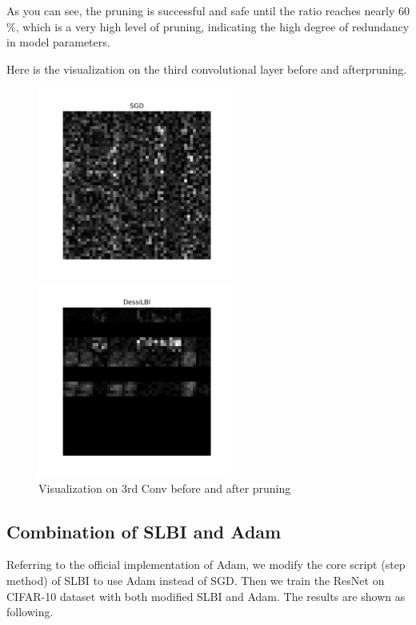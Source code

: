 \documentclass[a4paper, 11pt]{article} %
\begin{document}
As you can see, the pruning is successful and safe until the ratio reaches nearly 60$\%$,
which is a very high level of pruning, indicating the high degree of redundancy in model
parameters.

Here is the visualization on the third convolutional layer before and afterpruning.

\begin{figure}[H]
	\begin{minipage}[t]{0.48\textwidth}
		\centering
		\includegraphics[width=2.5in]{./img/conv-sgd.png}
	\end{minipage}
	\begin{minipage}[t]{0.48\textwidth}
		\centering
		\includegraphics[width=2.5in]{./img/conv-slbi.png}
	\end{minipage}
	\caption{Visualization on 3rd Conv before and after pruning}
\end{figure}

\subsection{\textbf{Combination of SLBI and Adam}}

Referring to the official implementation of Adam, we modify the core script (step method)
of SLBI to use Adam instead of SGD. Then we train the ResNet on CIFAR-10 dataset with
both modified SLBI and Adam. The results are shown as following.
\end{document}
